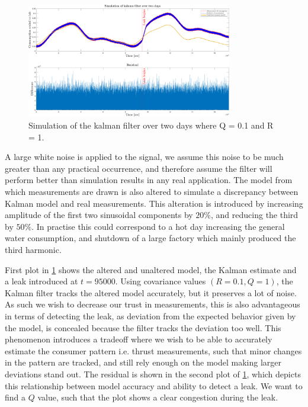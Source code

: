 \begin{figure}[h!]
	\centering
	\includegraphics[width=0.8\textwidth]{Pictures/Kalman_and_Residual_Q01_R1.pdf}
	
	\caption{Simulation of the kalman filter over two days where Q = 0.1 and R = 1.}
	\label{fig:Kalman_residual_Q01R1}
\end{figure}


A large white noise is applied to the signal, we assume this noise to be much greater than any practical occurrence, and therefore assume the filter will perform better than simulation results in any real application. The model from which measurements are drawn is also altered to simulate a discrepancy between Kalman model and real measurements. This alteration is introduced by increasing amplitude of the first two sinusoidal components by $20\%$, and reducing the third by $50\%$. In practise this could correspond to a hot day increasing the general water consumption, and shutdown of a large factory which mainly produced the third harmonic.

First plot in \cref{fig:Kalman_residual_Q01R1} shows the altered and unaltered model, the Kalman estimate and a leak introduced at $t = 95000$. Using covariance values $(R = 0.1, Q = 1)$, the Kalman filter tracks the altered model accurately, but it preserves a lot of noise. As such we wish to decrease our trust in measurements, this is also advantageous in terms of detecting the leak, as deviation from the expected behavior given by the model, is concealed because the filter tracks the deviation too well. This phenomenon introduces a tradeoff where we wish to be able to accurately estimate the consumer pattern i.e. thrust measurements, such that minor changes in the pattern are tracked, and still rely enough on the model making larger deviations stand out. The residual is shown in the second plot of \cref{fig:Kalman_residual_Q01R1}, which depicts this relationship between model accuracy and ability to detect a leak. We want to find a $Q$ value, such that the plot shows a clear congestion during the leak. 


